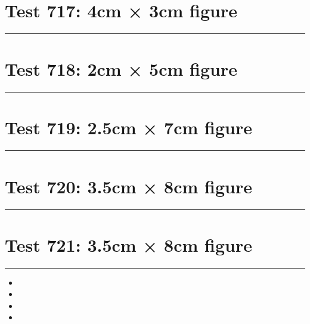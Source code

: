 \documentclass[a4paper,11pt]{article}
\begin{document}
\section*{Test 717: 4cm × 3cm figure}
\begin{swarmwrap}%
  \begin{minipage}[t]{4cm}
    \centering
    \rule{\linewidth}{3cm}
  \end{minipage}%
\end{swarmwrap}%
\swarmwrapnext
\lipsum[82]
\lipsum[83]
\lipsum[84]
\lipsum[85]
\section*{Test 718: 2cm × 5cm figure}
\begin{swarmwrap}%
  \begin{minipage}[t]{2cm}
    \centering
    \rule{\linewidth}{5cm}
  \end{minipage}%
\end{swarmwrap}%
\swarmwrapnext
\lipsum[31]
\lipsum[32]
\lipsum[33]
\lipsum[34]
\lipsum[35]
\section*{Test 719: 2.5cm × 7cm figure}
\begin{swarmwrap}%
  \begin{minipage}[t]{2cm}
    \centering
    \rule{\linewidth}{7cm}
  \end{minipage}%
\end{swarmwrap}%
\swarmwrapnext
\lipsum[132]
\lipsum[133]
\lipsum[134]
\lipsum[135]
\section*{Test 720: 3.5cm × 8cm figure}
\begin{swarmwrap}%
  \begin{minipage}[t]{3cm}
    \centering
    \rule{\linewidth}{8cm}
  \end{minipage}%
\end{swarmwrap}%
\swarmwrapnext
\lipsum[149]
\lipsum[150]
\lipsum[1]
\lipsum[2]
\section*{Test 721: 3.5cm × 8cm figure}
\begin{swarmwrap}%
  \begin{minipage}[t]{3cm}
    \centering
    \rule{\linewidth}{8cm}
  \end{minipage}%
\end{swarmwrap}%
\swarmwrapnext
\lipsum[125]
\begin{itemize}
  \item \lipsum[126][1-3]
  \item \lipsum[127][1-3]
  \item \lipsum[128][1-3]
  \item \lipsum[129][1-3]
\end{itemize}
\end{document}
